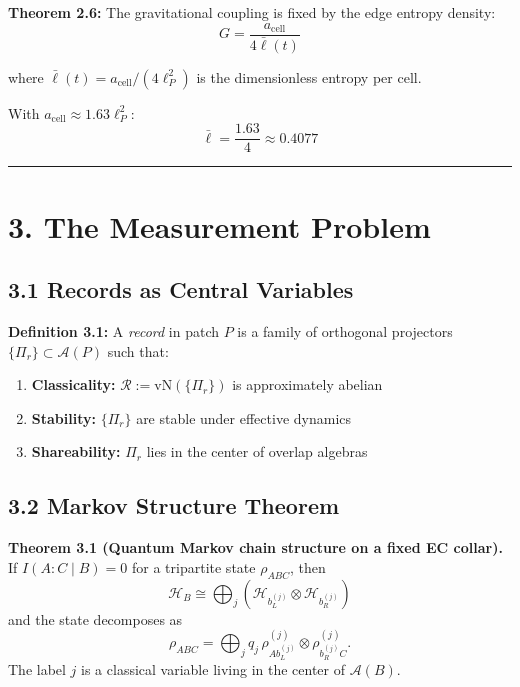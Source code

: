 \textbf{Theorem 2.6:} The gravitational coupling is fixed by the edge entropy density: \[G = \frac{a_{\text{cell}}}{4\bar{\ell}(t)}\]

where \(\bar{\ell}(t) = a_{\text{cell}}/(4\ell_P^2)\) is the dimensionless entropy per cell.

With \(a_{\text{cell}} \approx 1.63 \ell_P^2\): \[\bar{\ell} = \frac{1.63}{4} \approx 0.4077\]

\begin{center}\rule{0.5\linewidth}{0.5pt}\end{center}

\section{3. The Measurement Problem}\label{3-the-measurement-problem}

\subsection{3.1 Records as Central Variables}\label{31-records-as-central-variables}

\textbf{Definition 3.1:} A \emph{record} in patch \(P\) is a family of orthogonal projectors \(\{\Pi_r\} \subset \mathcal{A}(P)\) such that:

\begin{enumerate}
\def\labelenumi{\arabic{enumi}.}
\tightlist
\item
  \textbf{Classicality:} \(\mathcal{R} := \text{vN}(\{\Pi_r\})\) is approximately abelian
\item
  \textbf{Stability:} \(\{\Pi_r\}\) are stable under effective dynamics
\item
  \textbf{Shareability:} \(\Pi_r\) lies in the center of overlap algebras
\end{enumerate}

\subsection{3.2 Markov Structure Theorem}\label{32-markov-structure-theorem}

\textbf{Theorem 3.1 (Quantum Markov chain structure on a fixed EC collar).} If \(I(A:C\mid B)=0\) for a tripartite state \(\rho_{ABC}\), then
\[
\mathcal H_B
\cong
\bigoplus_j
\left(
\mathcal H_{b_L^{(j)}}\otimes \mathcal H_{b_R^{(j)}}
\right)
\]
and the state decomposes as
\[
\rho_{ABC}
=
\bigoplus_j
q_j\,
\rho^{(j)}_{A b_L^{(j)}}\otimes \rho^{(j)}_{b_R^{(j)} C}.
\]
The label \(j\) is a classical variable living in the center of \(\mathcal A(B)\).


